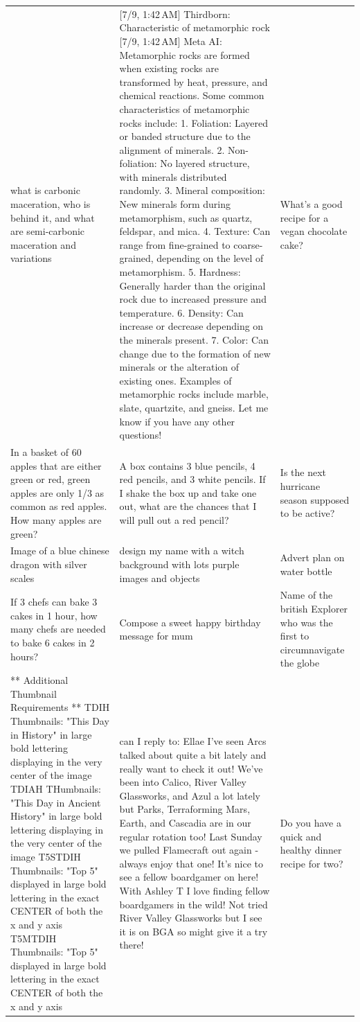 \begin{table}[ht]
\begin{tabular}{p{4.3cm}p{4.3cm}p{4.3cm}}
what is carbonic maceration, who is behind it, and what are semi-carbonic maceration and variations & [7/9, 1:42 AM] Thirdborn: Characteristic of metamorphic rock [7/9, 1:42 AM] Meta AI: Metamorphic rocks are formed when existing rocks are transformed by heat, pressure, and chemical reactions. Some common characteristics of metamorphic rocks include:  1. Foliation: Layered or banded structure due to the alignment of minerals. 2. Non-foliation: No layered structure, with minerals distributed randomly. 3. Mineral composition: New minerals form during metamorphism, such as quartz, feldspar, and mica. 4. Texture: Can range from fine-grained to coarse-grained, depending on the level of metamorphism. 5. Hardness: Generally harder than the original rock due to increased pressure and temperature. 6. Density: Can increase or decrease depending on the minerals present. 7. Color: Can change due to the formation of new minerals or the alteration of existing ones.  Examples of metamorphic rocks include marble, slate, quartzite, and gneiss. Let me know if you have any other questions! & What’s a good recipe for a vegan chocolate cake? \\[4pt]
In a basket of 60 apples that are either green or red, green apples are only 1/3 as common as red apples. How many apples are green? & A box contains 3 blue pencils, 4 red pencils, and 3 white pencils. If I shake the box up and take one out, what are the chances that I will pull out a red pencil? & Is the next hurricane season supposed to be active? \\[4pt]
Image of a blue chinese dragon with silver scales & design my name with a witch background with lots purple images and objects & Advert plan on water bottle \\[4pt]
If 3 chefs can bake 3 cakes in 1 hour, how many chefs are needed to bake 6 cakes in 2 hours? & Compose a sweet  happy birthday message for mum & Name of the british Explorer who was the first to circumnavigate the globe \\[4pt]
** Additional Thumbnail Requirements ** TDIH Thumbnails: "This Day in History" in large bold lettering displaying in the very center of the image TDIAH THumbnails: "This Day in Ancient History" in large bold lettering displaying in the very center of the image T5STDIH Thumbnails: "Top 5" displayed in large bold lettering in the exact CENTER of both the x and y axis T5MTDIH Thumbnails: "Top 5" displayed in large bold lettering in the exact CENTER of both the x and y axis & can I reply to: Ellae I’ve seen Arcs talked about quite a bit lately and really want to check it out! We’ve been into Calico, River Valley Glassworks, and Azul a lot lately but Parks, Terraforming Mars, Earth, and Cascadia are in our regular rotation too!  Last Sunday we pulled Flamecraft out again - always enjoy that one! It’s nice to see a fellow boardgamer on here!   With  Ashley T I love finding fellow boardgamers in the wild!  Not tried River Valley Glassworks but I see it is on BGA so might give it a try there! & Do you have a quick and healthy dinner recipe for two? \\[4pt]

\end{tabular}
\end{table}
